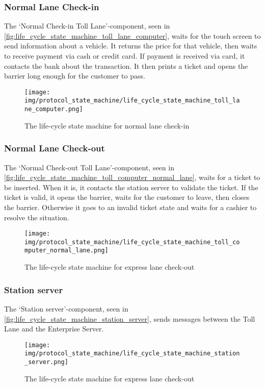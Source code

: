 \subsubsection*{Normal Lane Check-in}
The ‘Normal Check-in Toll Lane’-component, seen in \autoref{fig:life_cycle_state_machine_toll_lane_computer}, waits for the touch screen to send information about a vehicle. It returns the price for that vehicle, then waits to receive payment via cash or credit card. If payment is received via card, it contacts the bank about the transaction. It then prints a ticket and opens the barrier long enough for the customer to pass.
\begin{figure}[H]
\centering
\texttt{[image: img/protocol\_state\_machine/life\_cycle\_state\_machine\_toll\_lane\_computer.png]}
\caption{The life-cycle state machine for normal lane check-in}
\label{fig:life_cycle_state_machine_toll_lane_computer}
\end{figure}

\subsubsection*{Normal Lane Check-out}
The ‘Normal Check-out Toll Lane’-component, seen in \autoref{fig:life_cycle_state_machine_toll_computer_normal_lane}, waits for a ticket to be inserted. When it is, it contacts the station server to validate the ticket. If the ticket is valid, it opens the barrier, waits for the customer to leave, then closes the barrier. Otherwise it goes to an invalid ticket state and waits for a cashier to resolve the situation.
\begin{figure}[H]
\centering
\texttt{[image: img/protocol\_state\_machine/life\_cycle\_state\_machine\_toll\_computer\_normal\_lane.png]}
\caption{The life-cycle state machine for express lane check-out}
\label{fig:life_cycle_state_machine_toll_computer_normal_lane}
\end{figure}

\subsubsection*{Station server}
The ‘Station server’-component, seen in \autoref{fig:life_cycle_state_machine_station_server}, sends messages between the Toll Lane and the Enterprise Server.
\begin{figure}[H]
\centering
\texttt{[image: img/protocol\_state\_machine/life\_cycle\_state\_machine\_station\_server.png]}
\caption{The life-cycle state machine for express lane check-out}
\label{fig:life_cycle_state_machine_station_server}
\end{figure}


